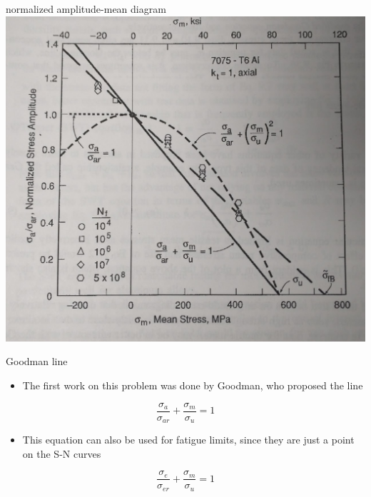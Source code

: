 \documentclass[
  letterpaper,
  ignorenonframetext,
  aspectratio=43,
  handout,
  12pt]{beamer}
\providecommand{\tightlist}{%
  \setlength{\itemsep}{0pt}\setlength{\parskip}{0pt}}
\providecommand{\tightlist}{%
\setlength{\itemsep}{0pt}\setlength{\parskip}{0pt}}
\let\Oldincludegraphics\includegraphics
\renewcommand{\includegraphics}[2][]{\Oldincludegraphics[width=\textwidth,height=0.7\textheight,keepaspectratio]{#2}}
\begin{document}
\begin{frame}{normalized amplitude-mean diagram}
\protect\hypertarget{normalized-amplitude-mean-diagram}{}
\includegraphics{../images/normalized.jpg}
\end{frame}

\begin{frame}{Goodman line}
\protect\hypertarget{goodman-line}{}
\begin{itemize}
\tightlist
\item
  The first work on this problem was done by Goodman, who proposed the
  line
\end{itemize}

\[\frac{\sigma_a}{\sigma_{ar}} + \frac{\sigma_m}{\sigma_u} = 1\]

\begin{itemize}
\tightlist
\item
  This equation can also be used for fatigue limits, since they are just
  a point on the S-N curves
\end{itemize}

\[\frac{\sigma_e}{\sigma_{er}} + \frac{\sigma_m}{\sigma_u} = 1\]
\end{frame}
\end{document}
